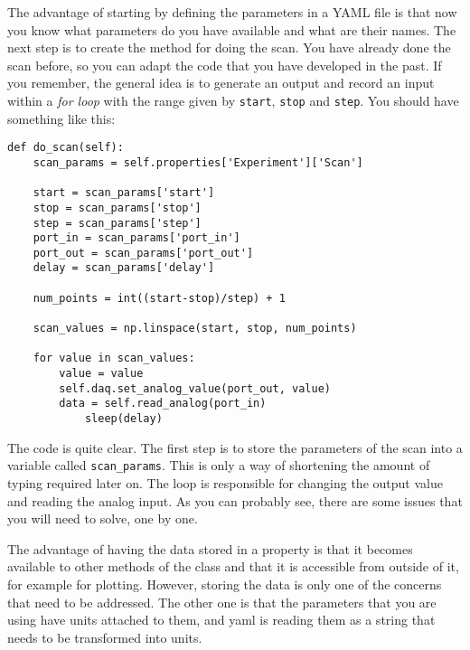 {The advantage of starting by defining the parameters in a {YAML} file is
that now you know what parameters do you have available and what are
their names. The next step is to create the method for doing the scan.
You have already done the scan before, so you can adapt the code that
you have developed in the past. If you remember, the general idea is to
generate an output and record an input within a \emph{for loop} with the
range given by \texttt{start}, \texttt{stop} and \texttt{step}. You
should have something like this:

\begin{verbatim}
def do_scan(self):
    scan_params = self.properties['Experiment']['Scan']
    
    start = scan_params['start']
    stop = scan_params['stop']
    step = scan_params['step']
    port_in = scan_params['port_in']
    port_out = scan_params['port_out']
    delay = scan_params['delay']

    num_points = int((start-stop)/step) + 1

    scan_values = np.linspace(start, stop, num_points)

    for value in scan_values:
        value = value
        self.daq.set_analog_value(port_out, value)
        data = self.read_analog(port_in)
            sleep(delay)
\end{verbatim}

The code is quite clear. The first step is to store the parameters of
the scan into a variable called \texttt{scan_params}. This is only a
way of shortening the amount of typing required later on. The loop is
responsible for changing the output value and reading the analog input.
As you can probably see, there are some issues that you will need to
solve, one by one.


The advantage of having the data stored in a property is that it
becomes available to other methods of the class and that it is
accessible from outside of it, for example for plotting. However,
storing the data is only one of the concerns that need to be addressed.
The other one is that the parameters that you are using have units
attached to them, and yaml is reading them as a string that needs to be
transformed into units.

}
